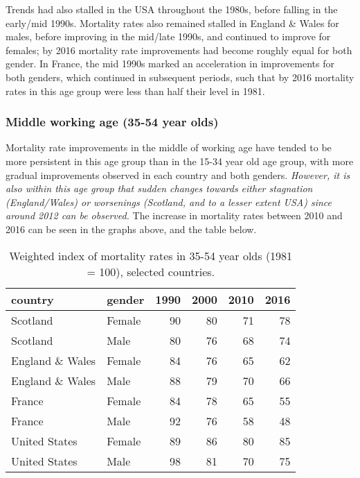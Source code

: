 \documentclass[]{article}
\begin{document}
Trends had also stalled in the USA throughout the 1980s, before falling
in the early/mid 1990s. Mortality rates also remained stalled in England
\& Wales for males, before improving in the mid/late 1990s, and
continued to improve for females; by 2016 mortality rate improvements
had become roughly equal for both gender. In France, the mid 1990s
marked an acceleration in improvements for both genders, which continued
in subsequent periods, such that by 2016 mortality rates in this age
group were less than half their level in 1981.

\subsubsection{Middle working age (35-54 year
olds)}\label{middle-working-age-35-54-year-olds}

Mortality rate improvements in the middle of working age have tended to
be more persistent in this age group than in the 15-34 year old age
group, with more gradual improvements observed in each country and both
genders. \emph{However, it is also within this age group that sudden
changes towards either stagnation (England/Wales) or worsenings
(Scotland, and to a lesser extent USA) since around 2012 can be
observed.} The increase in mortality rates between 2010 and 2016 can be
seen in the graphs above, and the table below.

\begin{table}

\caption{\label{tab:unnamed-chunk-7}Weighted index of mortality rates in 35-54 year olds (1981 = 100), selected countries.}
\centering
\begin{tabular}[t]{l|l|r|r|r|r}
\hline
country & gender & 1990 & 2000 & 2010 & 2016\\
\hline
Scotland & Female & 90 & 80 & 71 & 78\\
\hline
Scotland & Male & 80 & 76 & 68 & 74\\
\hline
England \& Wales & Female & 84 & 76 & 65 & 62\\
\hline
England \& Wales & Male & 88 & 79 & 70 & 66\\
\hline
France & Female & 84 & 78 & 65 & 55\\
\hline
France & Male & 92 & 76 & 58 & 48\\
\hline
United States & Female & 89 & 86 & 80 & 85\\
\hline
United States & Male & 98 & 81 & 70 & 75\\
\hline
\end{tabular}
\end{table}
\end{document}
